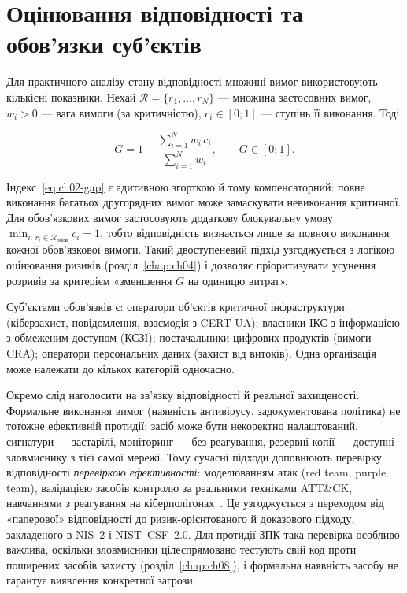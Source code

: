 \section{Оцінювання відповідності та обов'язки суб'єктів}\label{sec:ch02-compliance}

Для практичного аналізу стану відповідності множині вимог використовують кількісні показники. Нехай $\mathcal{R}=\{r_1,\dots,r_N\}$ --- множина застосовних вимог, $w_i>0$ --- вага вимоги (за критичністю), $c_i\in[0;1]$ --- ступінь її виконання. Тоді 

\begin{equation}
G = 1 - \frac{\sum_{i=1}^{N} w_i\, c_i}{\sum_{i=1}^{N} w_i},\qquad G\in[0;1].
\label{eq:ch02-gap}
\end{equation}

Індекс~\eqref{eq:ch02-gap} є адитивною згорткою й тому компенсаторний: повне виконання багатьох другорядних вимог може замаскувати невиконання критичної. Для обов'язкових вимог застосовують додаткову блокувальну умову $\min_{i:\,r_i\in\mathcal{R}_{\text{обов}}} c_i = 1$, тобто відповідність визнається лише за повного виконання кожної обов'язкової вимоги. Такий двоступеневий підхід узгоджується з логікою оцінювання ризиків (розділ~\ref{chap:ch04}) і дозволяє пріоритизувати усунення розривів за критерієм «зменшення $G$ на одиницю витрат».

Суб'єктами обов'язків є: оператори об'єктів критичної інфраструктури (кіберзахист, повідомлення, взаємодія з CERT-UA); власники ІКС з інформацією з обмеженим доступом (КСЗІ); постачальники цифрових продуктів (вимоги CRA); оператори персональних даних (захист від витоків). Одна організація може належати до кількох категорій одночасно.

Окремо слід наголосити на зв'язку відповідності й реальної захищеності. Формальне виконання вимог (наявність антивірусу, задокументована політика) не тотожне ефективній протидії: засіб може бути некоректно налаштований, сигнатури --- застарілі, моніторинг --- без реагування, резервні копії --- доступні зловмиснику з тієї самої мережі. Тому сучасні підходи доповнюють перевірку відповідності \emph{перевіркою ефективності}: моделюванням атак (red team, purple team), валідацією засобів контролю за реальними техніками ATT\&CK, навчаннями з реагування на кіберполігонах~\cite{ch02:polotai-ids}. Це узгоджується з переходом від «паперової» відповідності до ризик-орієнтованого й доказового підходу, закладеного в NIS~2 і NIST~CSF~2.0. Для протидії ЗПК така перевірка особливо важлива, оскільки зловмисники цілеспрямовано тестують свій код проти поширених засобів захисту (розділ~\ref{chap:ch08}), і формальна наявність засобу не гарантує виявлення конкретної загрози.

